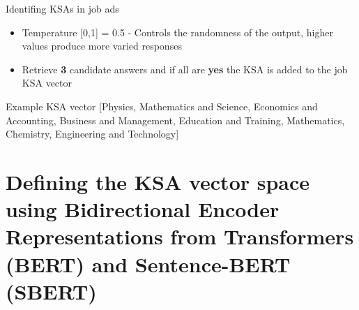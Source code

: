 \documentclass{beamer}
\begin{document}

\begin{frame}{Identifing KSAs in job ads}

\begin{itemize}
  \item Temperature [0,1] = 0.5 - Controls the randomness of the output, higher values produce more varied responses
  \item Retrieve \textbf{3} candidate answers and if all are \textbf{yes} the KSA is added to the job KSA vector
\end{itemize}

\begin{exampleblock}{Example KSA vector}
  [Physics, Mathematics and Science, Economics and Accounting, Business and Management, Education and Training, Mathematics, Chemistry, Engineering and Technology]
\end{exampleblock}
  
\end{frame}


\section{Defining the KSA vector space using Bidirectional Encoder Representations from Transformers (BERT) and Sentence-BERT (SBERT)}
\end{document}
